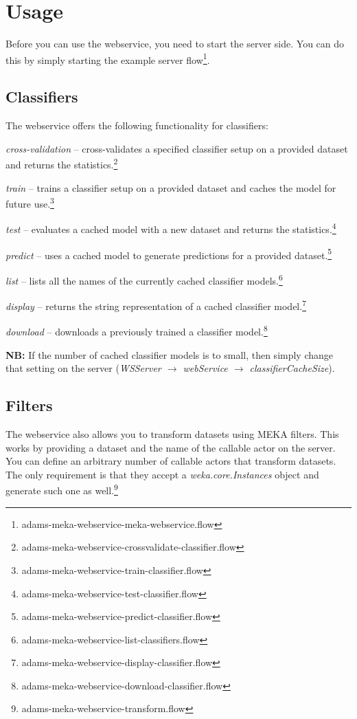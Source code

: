 \documentclass[a4paper]{book}
\begin{document}
\clearpage
\chapter{Usage}
Before you can use the webservice, you need to start the server side. You can
do this by simply starting the example server 
flow\footnote{adams-meka-webservice-meka-webservice.flow}.

\section{Classifiers}
The webservice offers the following functionality for classifiers:
\begin{tight_itemize}
	\item \textit{cross-validation} -- cross-validates a specified classifier
	setup on a provided dataset and returns the statistics.\footnote{adams-meka-webservice-crossvalidate-classifier.flow}
	\item \textit{train} -- trains a classifier setup on a provided dataset 
	and caches the model for future use.\footnote{adams-meka-webservice-train-classifier.flow}
	\item \textit{test} -- evaluates a cached model with a new dataset and 
	returns the statistics.\footnote{adams-meka-webservice-test-classifier.flow}
	\item \textit{predict} -- uses a cached model to generate predictions for
	a provided dataset.\footnote{adams-meka-webservice-predict-classifier.flow}
	\item \textit{list} -- lists all the names of the currently cached classifier
	models.\footnote{adams-meka-webservice-list-classifiers.flow}
	\item \textit{display} -- returns the string representation of a cached
	classifier model.\footnote{adams-meka-webservice-display-classifier.flow}
	\item \textit{download} -- downloads a previously trained a classifier 
	model.\footnote{adams-meka-webservice-download-classifier.flow}
\end{tight_itemize}
\textbf{NB:} If the number of cached classifier models is to small, then simply 
change that setting on the server
(\textit{WSServer $\rightarrow$ webService $\rightarrow$ classifierCacheSize}).

\section{Filters}
The webservice also allows you to transform datasets using MEKA filters. This
works by providing a dataset and the name of the callable actor on the server.
You can define an arbitrary number of callable actors that transform datasets.
The only requirement is that they accept a \textit{weka.core.Instances} object
and generate such one as well.\footnote{adams-meka-webservice-transform.flow}
\end{document}
